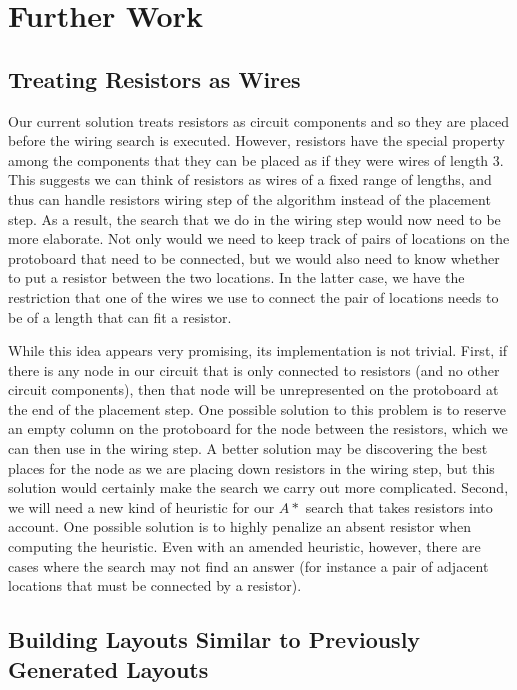 \section{Further Work}

\subsection{Treating Resistors as Wires}

Our current solution treats resistors as circuit components and so they are
placed before the wiring search is executed.
However, resistors have the special property among the components that
they can be placed as if they were wires of length $3$.
This suggests we can think of resistors as wires of a fixed range of lengths,
and thus can handle resistors wiring step of the algorithm instead of
the placement step. As a result, the search that we do in the wiring step would
now need to be
more elaborate. Not only would we need to keep track of pairs of locations on the
protoboard that need to be connected, but we would also need to know whether to
put a resistor between the two locations. In the latter case, we have the
restriction that one of the wires we use to connect the pair of locations needs
to be of a length that can fit a resistor.

While this idea appears very promising, its implementation is not trivial.
First, if there is any node in our circuit that is only
connected to resistors (and no other circuit components), then that node will be
unrepresented on the protoboard at the end of the placement step. One possible
solution to this problem is to reserve an empty column on the
protoboard for the node between the resistors, which we can then use in the
wiring step. A better solution may
be discovering the best places for the node as we are placing down resistors in
the wiring step, but this solution would certainly make the search we carry out
more complicated. Second, we will need a new kind of heuristic for our $A*$
search that takes resistors into account. One possible solution is to highly
penalize an absent resistor when computing the heuristic.
Even with an amended heuristic, however, there
are cases where the search may not find an answer (for instance a pair of
adjacent locations that must be connected by a resistor).

\subsection{Building Layouts Similar to Previously Generated Layouts}

